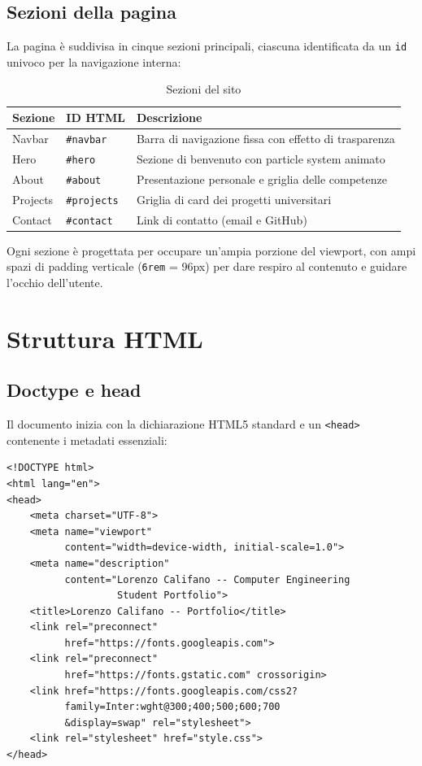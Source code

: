 \documentclass[a4paper,12pt]{report}
\begin{document}
\section{Sezioni della pagina}

La pagina \`e suddivisa in cinque sezioni principali, ciascuna identificata da un \texttt{id} univoco per la navigazione interna:

\begin{table}[H]
\centering
\caption{Sezioni del sito}
\begin{tabularx}{\textwidth}{l l X}
\toprule
\textbf{Sezione} & \textbf{ID HTML} & \textbf{Descrizione} \\
\midrule
Navbar & \texttt{\#navbar} & Barra di navigazione fissa con effetto di trasparenza \\
Hero & \texttt{\#hero} & Sezione di benvenuto con particle system animato \\
About & \texttt{\#about} & Presentazione personale e griglia delle competenze \\
Projects & \texttt{\#projects} & Griglia di card dei progetti universitari \\
Contact & \texttt{\#contact} & Link di contatto (email e GitHub) \\
\bottomrule
\end{tabularx}
\end{table}

Ogni sezione \`e progettata per occupare un'ampia porzione del viewport, con ampi spazi di padding verticale (\texttt{6rem} = 96px) per dare respiro al contenuto e guidare l'occhio dell'utente.


\chapter{Struttura HTML}

\section{Doctype e head}

Il documento inizia con la dichiarazione HTML5 standard e un \texttt{<head>} contenente i metadati essenziali:

\begin{lstlisting}[style=htmlstyle, caption={Head del documento}]
<!DOCTYPE html>
<html lang="en">
<head>
    <meta charset="UTF-8">
    <meta name="viewport"
          content="width=device-width, initial-scale=1.0">
    <meta name="description"
          content="Lorenzo Califano -- Computer Engineering
                   Student Portfolio">
    <title>Lorenzo Califano -- Portfolio</title>
    <link rel="preconnect"
          href="https://fonts.googleapis.com">
    <link rel="preconnect"
          href="https://fonts.gstatic.com" crossorigin>
    <link href="https://fonts.googleapis.com/css2?
          family=Inter:wght@300;400;500;600;700
          &display=swap" rel="stylesheet">
    <link rel="stylesheet" href="style.css">
</head>
\end{lstlisting}
\end{document}
